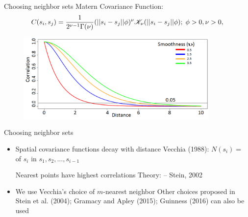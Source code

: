 \begin{frame}{Choosing neighbor sets}
	Matern Covariance Function: 
	\begin{equation*}\label{matern}
	C(s_i, s_j) = \frac{1}{2^{\nu - 1}\Gamma(\nu)}(||s_i-s_j||\phi)^{\nu}{\cal K}_{\nu}(||s_i-s_j||\phi);\; \phi > 0, \nu >0,
	\end{equation*}
	\begin{figure}
		\centering
		\includegraphics[width=10cm]{../figures/matern.png}
	\end{figure}
\end{frame}

\begin{frame}{Choosing neighbor sets}
	\begin{itemize}
		\item Spatial covariance functions decay with distance
		\myitem Vecchia (1988): $N(s_i) =$  of $s_i$ in $s_1, s_2, \ldots, s_{i-1}$
		\begin{itemize}
			\myitem Nearest points have highest correlations
			\myitem Theory:  -- Stein, 2002
		\end{itemize}
		\item We use Vecchia's choice of $m$-nearest neighbor
		\myitem Other choices proposed in Stein et al. (2004); Gramacy and Apley (2015); Guinness (2016) can also be used
	\end{itemize}
\end{frame}

